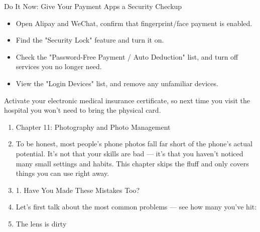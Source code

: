 \begin{tcbwarn}{Do It Now: Give Your Payment Apps a Security Checkup}
\begin{itemize}
  \item Open Alipay and WeChat, confirm that fingerprint/face payment is enabled.
  \item Find the "Security Lock" feature and turn it on.
  \item Check the "Password-Free Payment / Auto Deduction" list, and turn off services you no longer need.
  \item View the "Login Devices" list, and remove any unfamiliar devices.
\end{itemize}

\end{tcbwarn}

\begin{tcbpractice}{Activate your electronic medical insurance certificate, so next time you visit the hospital you won't need to bring the physical card.}
\begin{enumerate}
  \item Chapter 11: Photography and Photo Management
  \item To be honest, most people's phone photos fall far short of the phone's actual potential. It's not that your skills are bad — it's that you haven't noticed many small settings and habits. This chapter skips the fluff and only covers things you can use right away.
  \item 1. Have You Made These Mistakes Too?
  \item Let's first talk about the most common problems — see how many you've hit:
  \item The lens is dirty
\end{enumerate}

\end{tcbpractice}
